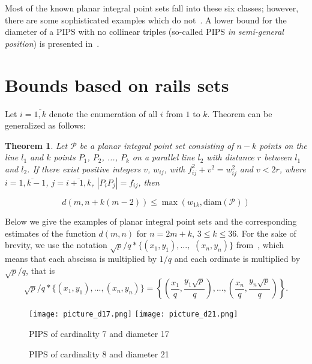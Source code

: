 \documentclass[12pt]{article}
\theoremstyle{theorem}
\newtheorem{theorem}{Theorem}
\theoremstyle{dfn}
\theoremstyle{remark}
\begin{document}
Most of the known planar integral point sets fall into these six classes;
however, there are some sophisticated examples which do not~\cite{kreisel2008heptagon,kurz2013constructing,avdeev2021particular}.
A lower bound for the diameter of a PIPS with no collinear triples (so-called PIPS \textit{in semi-general position})
is presented in~\cite{my-semi-general-5-4-bound-2019}.



\section{Bounds based on rails sets}

Let $i = \overline{1, k}$ denote the enumeration of all $i$
from $1$ to $k$.
Theorem \cite[Theorem 2.1]{kurz2008bounds} can be generalized as follows:

\begin{theorem}
	\label{thm:rails_blowup}
	Let $\mathcal{P}$ be a planar integral point set consisting of
	$n - k$ points on the line $l_1$ and $k$ points $P_1$, $P_2$, ..., $P_k$ on a
	parallel line $l_2$ with distance $r$ between $l_1$ and $l_2$. If there
	exist positive integers $v$, $w_{ij}$, with $f_{ij}^{2} + v^{2}
	= w_{ij}^{2}$ and $v < 2r$, where $i = \overline{1, k - 1}$, $j =
	\overline{i + 1, k}$, $|P_{i}P_{j}| = f_{ij}$,
	then

	\begin{equation}
		d(m, n + k(m - 2)) \leq \max(w_{1k}, \operatorname{diam(\mathcal{P})})
	\end{equation}

\end{theorem}

Below we give the examples of planar integral point sets and the corresponding
estimates of the function $d(m, n)$ for $n = 2m + k$, $3 \leq k \leq 36$.
For the sake of brevity, we use the notation
$\sqrt{p}/q * \{ (x_1,y_1), ...,$ $ (x_n, y_n)  \}$
from~\cite{our-ped-2018,our-pmm-2018,our-vmmsh-2018},
which means that each abscissa is multiplied by $1/q$
and each ordinate is multiplied by $\sqrt{p}/q$,  that is
$$
	\sqrt{p}/q * \{ (x_1,y_1), ..., (x_n, y_n)  \}
	=
	\left\{ \left(\frac{x_1}{q},\frac{y_1\sqrt{p}}{q}\right), ..., \left(\frac{x_n}{q},   \frac{y_n\sqrt{p}}{q}\right)  \right\}.
$$


\begin{figure}[htbp]
	\texttt{[image: picture\_d17.png]}
	\hfill
	\texttt{[image: picture\_d21.png]}
	\\
	\parbox{.48\linewidth}{\caption{PIPS of cardinality 7 and diameter 17}
	\label{picture_d17.png}}
	\hfill
	\parbox{.48\linewidth}{\caption{PIPS of cardinality 8 and diameter 21}
	\label{picture_d21.png}}
\end{figure}
\end{document}
